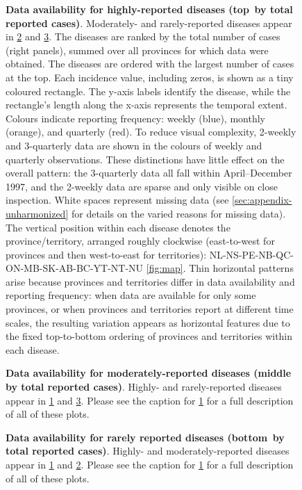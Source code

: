 \documentclass[12pt]{article}
\begin{document}
\begin{figure}[!htb]
\caption{\textbf{Data availability for highly-reported diseases (top \protect\,by total reported cases)}. Moderately- and rarely-reported diseases appear in \cref{fig:extent-2} and \cref{fig:extent-3}. The diseases are ranked by the total number of cases (right panels), summed over all provinces for which data were obtained. The diseases are ordered with the largest number of cases at the top. Each incidence value, including zeros, is shown as a tiny coloured rectangle. The y-axis labels identify the disease, while the rectangle's length along the x-axis represents the temporal extent. Colours indicate reporting frequency: weekly (blue), monthly (orange), and quarterly (red). To reduce visual complexity, 2-weekly and 3-quarterly data are shown in the colours of weekly and quarterly observations. These distinctions have little effect on the overall pattern: the 3-quarterly data all fall within April–December 1997, and the 2-weekly data are sparse and only visible on close inspection. White spaces represent missing data (see \cref{sec:appendix-unharmonized} for details on the varied reasons for missing data). The vertical position within each disease denotes the province/territory, arranged roughly clockwise (east-to-west for provinces and then west-to-east for territories): NL-NS-PE-NB-QC-ON-MB-SK-AB-BC-YT-NT-NU \cref{fig:map}. Thin horizontal patterns arise because provinces and territories differ in data availability and reporting frequency: when data are available for only some provinces, or when provinces and territories report at different time scales, the resulting variation appears as horizontal features due to the fixed top-to-bottom ordering of provinces and territories within each disease.}\label{fig:extent-1}
\end{figure}

\begin{figure}[!htb]
\caption{\textbf{Data availability for moderately-reported diseases (middle \protect\,by total reported cases)}. Highly- and rarely-reported diseases appear in \cref{fig:extent-1} and \cref{fig:extent-3}. Please see the caption for \cref{fig:extent-1} for a full description of all of these plots.}\label{fig:extent-2}
\end{figure}

\begin{figure}[!htb]
\caption{\textbf{Data availability for rarely reported diseases (bottom \protect\,by total reported cases)}. Highly- and moderately-reported diseases appear in \cref{fig:extent-1} and \cref{fig:extent-2}. Please see the caption for \cref{fig:extent-1} for a full description of all of these plots.}\label{fig:extent-3}
\end{figure}
\end{document}

